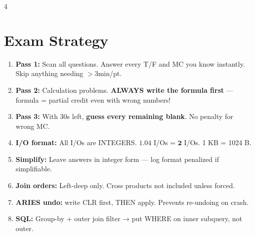 \documentclass[8pt,letterpaper]{article}
\newcommand{\key}[1]{\textbf{\color{red!70!black}#1}}
\newcommand{\warn}[1]{\textbf{\color{orange!85!black}#1}}
\begin{document}
\begin{multicols*}{4}
\section{Exam Strategy}
\begin{enumerate}
  \item \key{Pass 1:} Scan all questions. Answer every T/F and MC you know instantly. Skip anything needing $>3$min/pt.
  \item \key{Pass 2:} Calculation problems. \warn{ALWAYS write the formula first} — formula = partial credit even with wrong numbers!
  \item \key{Pass 3:} With 30s left, \textbf{guess every remaining blank}. No penalty for wrong MC.
  \item \key{I/O format:} All I/Os are INTEGERS. $1.04$ I/Os = $\mathbf{2}$ I/Os. 1 KB = 1024 B.
  \item \key{Simplify:} Leave answers in integer form — log format penalized if simplifiable.
  \item \key{Join orders:} Left-deep only. Cross products not included unless forced.
  \item \key{ARIES undo:} write CLR first, THEN apply. Prevents re-undoing on crash.
  \item \key{SQL:} Group-by + outer join filter → put WHERE on inner subquery, not outer.
\end{enumerate}

\end{multicols*}
\end{document}
